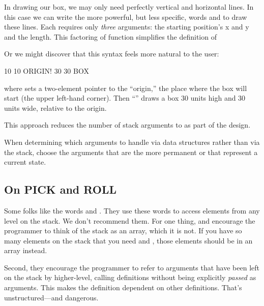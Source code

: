 In drawing our box, we may only need perfectly vertical and horizontal
lines. In this case we can write the more powerful, but less specific,
words  and  to draw these lines. Each
requires only \emph{three} arguments: the starting position's x and y and
the length. This factoring of function simplifies the definition of

Or we might discover that this syntax feels more natural to the
user:

\begin{Code}
10 10 ORIGIN! 30 30 BOX
\end{Code}
where  sets a two-element pointer to the ``origin,'' the
place where the box will start (the upper left-hand corner). Then
``'' draws a box 30 units high and 30 units wide,
relative to the origin.

This approach reduces the number of stack arguments to  as
part of the design.

\begin{tip}
When determining which arguments to handle via data structures rather
than via the stack, choose the arguments that are the more permanent or
that represent a current state.
\end{tip}%
%
%
%
%

\subsection{On PICK and ROLL}%
%
%
%

Some folks like the words  and . They use these
words to access elements from any level on the stack. We don't recommend
them.  For one thing,  and  encourage the
programmer to think of the stack as an array, which it is not. If you have
so many elements on the stack that you need  and
, those elements should be in an array instead.

Second, they encourage the programmer to refer to arguments that
have been left on the stack by higher-level, calling definitions without
being explicitly \emph{passed} as arguments. This makes the definition
dependent on other definitions. That's unstructured---and dangerous.

